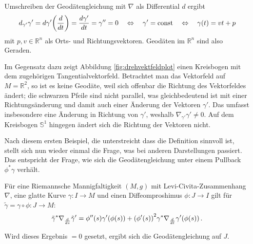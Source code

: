 \documentclass[../H_Analysis_main.tex]{subfiles}
\begin{document}
\begin{bsp}[Geraden]
Umschreiben der Geodätengleichung mit $\nabla$ als Differential $d$ ergibt
\begin{equation}
d_{\gamma'} \gamma' = d\gamma'\qty(\dv{t}) = \dv{\gamma'}{t} = \gamma'' = 0 \quad \Leftrightarrow \quad \gamma' = \text{const} \quad \Leftrightarrow \quad \gamma(t) = v t + p
\end{equation}
mit $p, v \in \mathbb{R}^n$ als Orts- und Richtungsvektoren. Geodäten im $\mathbb{R}^n$ sind also Geraden.

Im Gegensatz dazu zeigt Abbildung \ref{fig:drehvektfeldplot} einen Kreisbogen mit dem zugehörigen Tangentialvektorfeld. Betrachtet man das Vektorfeld auf $M = \mathbb{R}^2$, so ist es keine Geodäte, weil sich offenbar die Richtung des Vektorfeldes ändert; die schwarzen Pfeile sind nicht parallel, was gleichbedeutend ist mit einer Richtungsänderung und damit auch einer Änderung der Vektoren $\gamma'$. Das umfasst insbesondere eine Änderung in Richtung von $\gamma'$, weshalb $\nabla_{\gamma'} \gamma' \neq 0$. Auf dem Kreisbogen $\mathbb{S}^1$ hingegen ändert sich die Richtung der Vektoren nicht.
\end{bsp}


\iffalse
\begin{figure}
\centering

\texttt{[image: Bilder/vectorfield\_example\_circle.pdf]}

\caption{Tangentialvektorfeld am Kreisbogen}
\label{fig:keine_geodaete}
\end{figure}
\fi


Nach diesem ersten Beispiel, die unterstreicht dass die Definition sinnvoll ist, stellt sich nun wieder einmal die Frage, was bei anderen Darstellungen passiert. Das entspricht der Frage, wie sich die Geodätengleichung unter einem Pullback $\phi^* \gamma$ verhält.
\begin{lemma}
Für eine Riemannsche Mannigfaltigkeit $(M, g)$ mit Levi-Civita-Zusammenhang $\nabla$, eine glatte Kurve $\gamma: I \rightarrow M$ und einen Diffeomproshimus $\phi: J \rightarrow I$ gilt für $\tilde{\gamma} = \gamma \circ \phi: J \rightarrow M$:
\begin{equation}
\tilde{\gamma}^* \nabla_{\dv{s}} \tilde{\gamma}' = \phi''(s) \gamma'\qty(\phi(s)) + \qty(\phi'(s))^2 \gamma^* \nabla_{\dv{t}} \gamma'\qty(\phi(s)) \, .
\end{equation}
\end{lemma}
Wird dieses Ergebnis $= 0$ gesetzt, ergibt sich die Geodätengleichung auf $J$.\\
\end{document}
